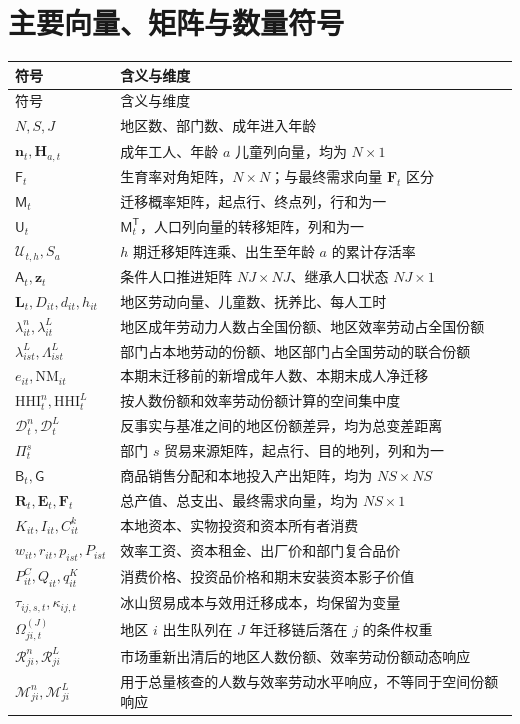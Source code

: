 \documentclass[UTF8,a4paper,zihao=-4,fontset=windows]{ctexart}
\numberwithin{equation}{section}
\newcommand{\pc}{P^{C}}
\newcommand{\invp}{Q}
\begin{document}
\section{主要向量、矩阵与数量符号}
{\small
\begin{longtable}{p{}p{}}
\toprule 符号 & 含义与维度\\\midrule\endfirsthead
\toprule 符号 & 含义与维度\\\midrule\endhead
\bottomrule\endfoot
$N,S,J$ & 地区数、部门数、成年进入年龄\\
$\bm n_t,\bm H_{a,t}$ & 成年工人、年龄 $a$ 儿童列向量，均为 $N\times1$\\
$\mathsf F_t$ & 生育率对角矩阵，$N\times N$；与最终需求向量 $\bm F_t$ 区分\\
$\mathsf M_t$ & 迁移概率矩阵，起点行、终点列，行和为一\\
$\mathsf U_t$ & $\mathsf M_t^{\mathsf T}$，人口列向量的转移矩阵，列和为一\\
$\mathcal U_{t,h},S_a$ & $h$ 期迁移矩阵连乘、出生至年龄 $a$ 的累计存活率\\
$\mathsf A_t,\bm z_t$ & 条件人口推进矩阵 $NJ\times NJ$、继承人口状态 $NJ\times1$\\
$\bm L_t,D_{it},d_{it},h_{it}$ & 地区劳动向量、儿童数、抚养比、每人工时\\
$\lambda^n_{it},\lambda^L_{it}$ & 地区成年劳动力人数占全国份额、地区效率劳动占全国份额\\
$\lambda^L_{ist},\Lambda^L_{ist}$ & 部门占本地劳动的份额、地区部门占全国劳动的联合份额\\
$e_{it},\mathrm{NM}_{it}$ & 本期末迁移前的新增成年人数、本期末成人净迁移\\
$\mathrm{HHI}^n_t,\mathrm{HHI}^L_t$ & 按人数份额和效率劳动份额计算的空间集中度\\
$\mathcal D^n_t,\mathcal D^L_t$ & 反事实与基准之间的地区份额差异，均为总变差距离\\
$\Pi_t^s$ & 部门 $s$ 贸易来源矩阵，起点行、目的地列，列和为一\\
$\mathsf B_t,\mathsf G$ & 商品销售分配和本地投入产出矩阵，均为 $NS\times NS$\\
$\bm R_t,\bm E_t,\bm F_t$ & 总产值、总支出、最终需求向量，均为 $NS\times1$\\
$K_{it},I_{it},C^k_{it}$ & 本地资本、实物投资和资本所有者消费\\
$w_{it},r_{it},p_{ist},P_{ist}$ & 效率工资、资本租金、出厂价和部门复合品价\\
$\pc_{it},\invp_{it},q^K_{it}$ & 消费价格、投资品价格和期末安装资本影子价值\\
$\tau_{ij,s,t},\kappa_{ij,t}$ & 冰山贸易成本与效用迁移成本，均保留为变量\\
$\Omega_{ji,t}^{(J)}$ & 地区 $i$ 出生队列在 $J$ 年迁移链后落在 $j$ 的条件权重\\
$\mathcal R^n_{ji},\mathcal R^L_{ji}$ & 市场重新出清后的地区人数份额、效率劳动份额动态响应\\
$\mathcal M^n_{ji},\mathcal M^L_{ji}$ & 用于总量核查的人数与效率劳动水平响应，不等同于空间份额响应\\
\end{longtable}}

\clearpage
{}
{}


\end{document}
